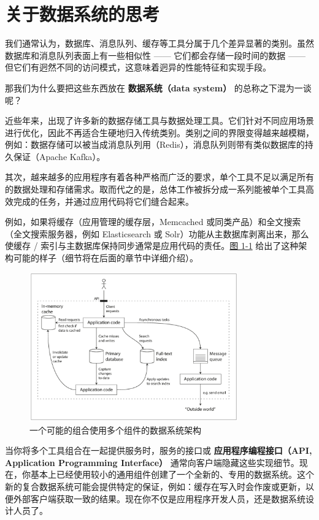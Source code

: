 \section{关于数据系统的思考}
我们通常认为，数据库、消息队列、缓存等工具分属于几个差异显著的类别。虽然数据库和消息队列表面上有一些相似性 —— 它们都会存储一段时间的数据 —— 但它们有迥然不同的访问模式，这意味着迥异的性能特征和实现手段。

那我们为什么要把这些东西放在 \textbf{数据系统（data system）} 的总称之下混为一谈呢？

近些年来，出现了许多新的数据存储工具与数据处理工具。它们针对不同应用场景进行优化，因此不再适合生硬地归入传统类别\cite{stonebraker2005}。类别之间的界限变得越来越模糊，例如：数据存储可以被当成消息队列用（Redis），消息队列则带有类似数据库的持久保证（Apache Kafka）。

其次，越来越多的应用程序有着各种严格而广泛的要求，单个工具不足以满足所有的数据处理和存储需求。取而代之的是，总体工作被拆分成一系列能被单个工具高效完成的任务，并通过应用代码将它们缝合起来。

例如，如果将缓存（应用管理的缓存层，Memcached 或同类产品）和全文搜索（全文搜索服务器，例如 Elasticsearch 或 Solr）功能从主数据库剥离出来，那么使缓存 / 索引与主数据库保持同步通常是应用代码的责任。\href{img/fig1-1.png}{图 1-1} 给出了这种架构可能的样子（细节将在后面的章节中详细介绍）。

\begin{figure}[h]
  \centering
  \includegraphics[width=0.8\textwidth]{img/fig1-1.png}
  \caption{一个可能的组合使用多个组件的数据系统架构}
  \label{fig:fig1-1}
\end{figure}

当你将多个工具组合在一起提供服务时，服务的接口或 \textbf{应用程序编程接口（API, Application Programming Interface）} 通常向客户端隐藏这些实现细节。现在，你基本上已经使用较小的通用组件创建了一个全新的、专用的数据系统。这个新的复合数据系统可能会提供特定的保证，例如：缓存在写入时会作废或更新，以便外部客户端获取一致的结果。现在你不仅是应用程序开发人员，还是数据系统设计人员了。

